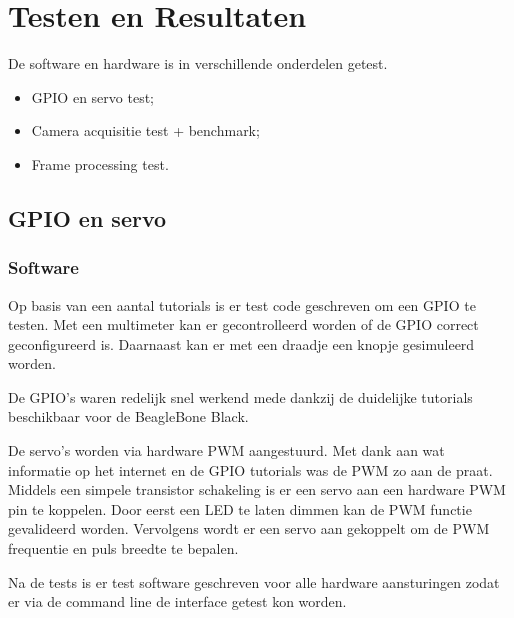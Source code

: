\chapter{Testen en Resultaten}
\label{chap:testing}


De software en hardware is in verschillende onderdelen getest.
\begin{itemize}
	\item GPIO en servo test;
	\item Camera acquisitie test + benchmark;
	\item Frame processing test.
\end{itemize}

\section{GPIO en servo}
\label{sec:gpioTest}

\subsection{Software}
\label{sub:gpioSoft}
Op basis van een aantal tutorials is er test code geschreven om een GPIO te 
testen. Met een multimeter kan er gecontrolleerd worden of de GPIO correct 
geconfigureerd is. Daarnaast kan er met een draadje een knopje gesimuleerd 
worden.

De GPIO's waren redelijk snel werkend mede dankzij de duidelijke tutorials 
beschikbaar voor de BeagleBone Black.

De servo's worden via hardware PWM aangestuurd. Met dank aan wat informatie 
op het internet en de GPIO tutorials was de PWM zo aan de praat. Middels een 
simpele transistor schakeling is er een servo aan een hardware PWM pin te koppelen.
Door eerst een LED te laten dimmen kan de PWM functie gevalideerd worden. 
Vervolgens wordt er een servo aan gekoppelt om de PWM frequentie en puls breedte 
te bepalen.

Na de tests is er test software geschreven voor alle hardware aansturingen 
zodat er via de command line de interface getest kon worden.

